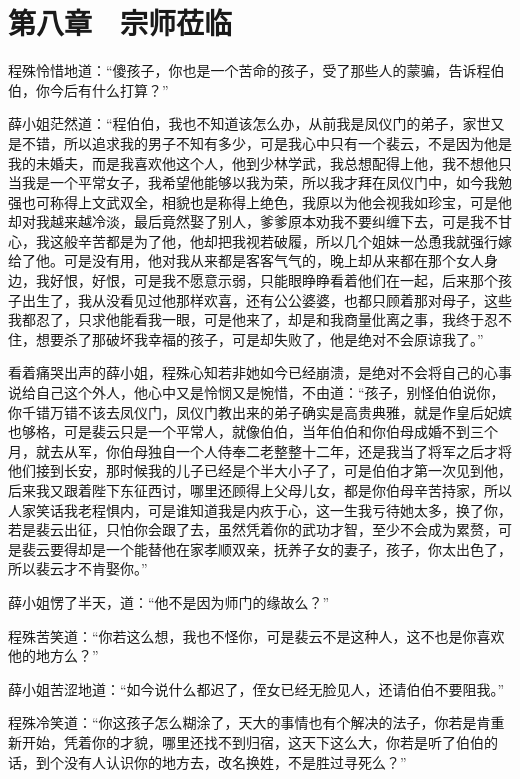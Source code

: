 \chapter{第八章　宗师莅临}

程殊怜惜地道：“傻孩子，你也是一个苦命的孩子，受了那些人的蒙骗，告诉程伯伯，你今后有什么打算？”

薛小姐茫然道：“程伯伯，我也不知道该怎么办，从前我是凤仪门的弟子，家世又是不错，所以追求我的男子不知有多少，可是我心中只有一个裴云，不是因为他是我的未婚夫，而是我喜欢他这个人，他到少林学武，我总想配得上他，我不想他只当我是一个平常女子，我希望他能够以我为荣，所以我才拜在凤仪门中，如今我勉强也可称得上文武双全，相貌也是称得上绝色，我原以为他会视我如珍宝，可是他却对我越来越冷淡，最后竟然娶了别人，爹爹原本劝我不要纠缠下去，可是我不甘心，我这般辛苦都是为了他，他却把我视若破履，所以几个姐妹一怂恿我就强行嫁给了他。可是没有用，他对我从来都是客客气气的，晚上却从来都在那个女人身边，我好恨，好恨，可是我不愿意示弱，只能眼睁睁看着他们在一起，后来那个孩子出生了，我从没看见过他那样欢喜，还有公公婆婆，也都只顾着那对母子，这些我都忍了，只求他能看我一眼，可是他来了，却是和我商量仳离之事，我终于忍不住，想要杀了那破坏我幸福的孩子，可是却失败了，他是绝对不会原谅我了。”

看着痛哭出声的薛小姐，程殊心知若非她如今已经崩溃，是绝对不会将自己的心事说给自己这个外人，他心中又是怜悯又是惋惜，不由道：“孩子，别怪伯伯说你，你千错万错不该去凤仪门，凤仪门教出来的弟子确实是高贵典雅，就是作皇后妃嫔也够格，可是裴云只是一个平常人，就像伯伯，当年伯伯和你伯母成婚不到三个月，就去从军，你伯母独自一个人侍奉二老整整十二年，还是我当了将军之后才将他们接到长安，那时候我的儿子已经是个半大小子了，可是伯伯才第一次见到他，后来我又跟着陛下东征西讨，哪里还顾得上父母儿女，都是你伯母辛苦持家，所以人家笑话我老程惧内，可是谁知道我是内疚于心，这一生我亏待她太多，换了你，若是裴云出征，只怕你会跟了去，虽然凭着你的武功才智，至少不会成为累赘，可是裴云要得却是一个能替他在家孝顺双亲，抚养子女的妻子，孩子，你太出色了，所以裴云才不肯娶你。”

薛小姐愣了半天，道：“他不是因为师门的缘故么？”

程殊苦笑道：“你若这么想，我也不怪你，可是裴云不是这种人，这不也是你喜欢他的地方么？”

薛小姐苦涩地道：“如今说什么都迟了，侄女已经无脸见人，还请伯伯不要阻我。”

程殊冷笑道：“你这孩子怎么糊涂了，天大的事情也有个解决的法子，你若是肯重新开始，凭着你的才貌，哪里还找不到归宿，这天下这么大，你若是听了伯伯的话，到个没有人认识你的地方去，改名换姓，不是胜过寻死么？”

